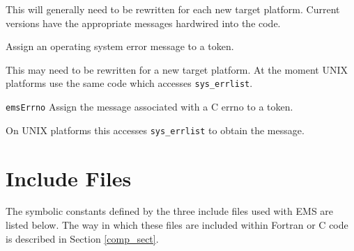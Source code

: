 \documentclass[twoside,11pt]{starlink}
\begin{document}
\begin {description}
This will generally need to be rewritten for each new target platform.
Current versions have the appropriate messages hardwired into the code.
\item [\htmlref{\texttt{EMS\_SYSER}}{EMS_SYSER}]  Assign an operating system
error message to a token.

This may need to be rewritten for a new target platform. At the
moment UNIX platforms use the same code which accesses \texttt{sys\_errlist}.
\item [\texttt{emsErrno}] Assign the message associated with a C errno to a
token.

On UNIX platforms this accesses \texttt{sys\_errlist} to obtain the message.
\end{description}

\section{Include Files}
\label{incl_sect}
The symbolic constants defined by the three include files used with EMS are
listed below. The way in which these files are included within Fortran or
C code is described in Section \ref{comp_sect}.
\end{document}
